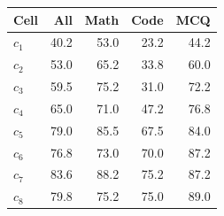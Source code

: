 \begin{tabular}{@{}lrrrr@{}}
\toprule
Cell & All & Math & Code & MCQ \\
\midrule
$c_1$ & 40.2 & 53.0 & 23.2 & 44.2 \\
$c_2$ & 53.0 & 65.2 & 33.8 & 60.0 \\
$c_3$ & 59.5 & 75.2 & 31.0 & 72.2 \\
$c_4$ & 65.0 & 71.0 & 47.2 & 76.8 \\
$c_5$ & 79.0 & 85.5 & 67.5 & 84.0 \\
$c_6$ & 76.8 & 73.0 & 70.0 & 87.2 \\
$c_7$ & 83.6 & 88.2 & 75.2 & 87.2 \\
$c_8$ & 79.8 & 75.2 & 75.0 & 89.0 \\
\bottomrule
\end{tabular}
